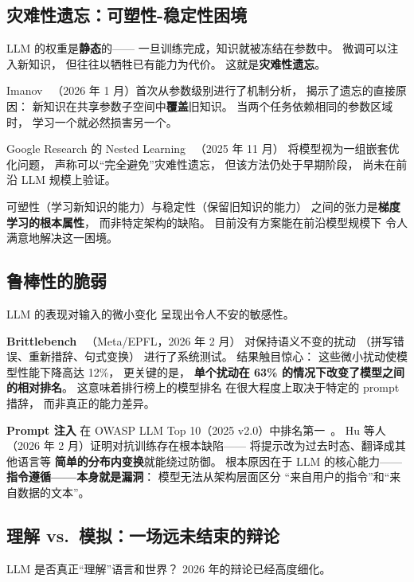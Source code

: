 \subsection{灾难性遗忘：可塑性-稳定性困境}

LLM 的权重是\textbf{静态}的——
一旦训练完成，知识就被冻结在参数中。
微调可以注入新知识，
但往往以牺牲已有能力为代价。
这就是\textbf{灾难性遗忘}。

Imanov~\cite{imanov2026catastrophic}
（2026 年 1 月）首次从参数级别进行了机制分析，
揭示了遗忘的直接原因：
新知识在共享参数子空间中\textbf{覆盖}旧知识。
当两个任务依赖相同的参数区域时，
学习一个就必然损害另一个。

Google Research 的 Nested Learning~\cite{behrouz2025nested}
（2025 年 11 月）
将模型视为一组嵌套优化问题，
声称可以``完全避免''灾难性遗忘，
但该方法仍处于早期阶段，
尚未在前沿 LLM 规模上验证。

可塑性（学习新知识的能力）与稳定性（保留旧知识的能力）
之间的张力是\textbf{梯度学习的根本属性}，
而非特定架构的缺陷。
目前没有方案能在前沿模型规模下
令人满意地解决这一困境。


\subsection{鲁棒性的脆弱}

LLM 的表现对输入的微小变化
呈现出令人不安的敏感性。

\textbf{Brittlebench}~\cite{romanou2026brittlebench}
（Meta/EPFL，2026 年 2 月）
对保持语义不变的扰动
（拼写错误、重新措辞、句式变换）
进行了系统测试。
结果触目惊心：
这些微小扰动使模型性能下降高达 12\%，
更关键的是，
\textbf{单个扰动在 63\% 的情况下改变了模型之间的相对排名}。
这意味着排行榜上的模型排名
在很大程度上取决于特定的 prompt 措辞，
而非真正的能力差异。

\textbf{Prompt 注入}
在 OWASP LLM Top 10（2025 v2.0）中排名第一~\cite{owasp2026llm}。
Hu 等人~\cite{hu2026promptinjection}
（2026 年 2 月）证明对抗训练存在根本缺陷——
将提示改为过去时态、翻译成其他语言等
\textbf{简单的分布内变换}就能绕过防御。
根本原因在于 LLM 的核心能力——
\textbf{指令遵循——本身就是漏洞}：
模型无法从架构层面区分
``来自用户的指令''和``来自数据的文本''。


\subsection{理解 vs.\ 模拟：一场远未结束的辩论}

LLM 是否真正``理解''语言和世界？
2026 年的辩论已经高度细化。

